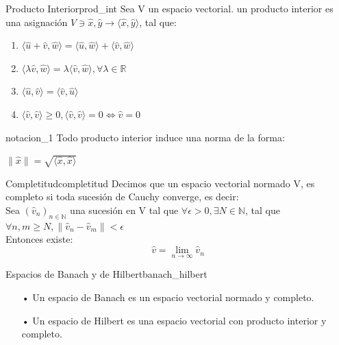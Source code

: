 \documentclass[12pt,a4paper]{book}
\providecommand{\norm}[1]{\lVert#1\rVert}
\providecommand{\inp}[1]{\langle#1\rangle}
\begin{document}
\smallskip

\begin{definicion}{Producto Interior}{prod_int}
Sea V un espacio vectorial. un producto interior es una asignación $V\ni\widehat{x},\widehat{y}\rightarrow \inp{\widehat{x},\widehat{y}}$, tal que:
\begin{enumerate}
\item $\inp{\widehat{u}+\widehat{v},\widehat{w}}=\inp{\widehat{u},\widehat{w}}+\inp{\widehat{v},\widehat{w}}$
\item $\inp{\lambda\widehat{v},\widehat{w}}=\lambda\inp{\widehat{v},\widehat{w}}, \forall\lambda\in\mathbb{R}$
\item $\inp{\widehat{u},\widehat{v}}=\inp{\widehat{v},\widehat{u}}$
\item $\inp{\widehat{v},\widehat{v}}\geq 0, \inp{\widehat{v},\widehat{v}}=0 \Leftrightarrow \widehat{v}=0$
\end{enumerate}
\end{definicion}

\smallskip

\begin{notacion}{}{notacion_1}
Todo producto interior induce una norma de la forma:
\begin{center}
$\norm{\widehat{x}}=\sqrt{\inp{\widehat{x},\widehat{x}}}$
\end{center}
\end{notacion}

\smallskip

\begin{definicion}{Completitud}{completitud}
Decimos que un espacio vectorial normado V, es completo si toda sucesión de Cauchy converge, es decir:\\

Sea $(\widehat{v}_{n})_{n\in\mathbb{N}}$ una sucesión en V tal que $\forall\epsilon >0, \exists N\in\mathbb{N}$, tal que $\forall n,m\geq N, \norm{\widehat{v}_{n}-\widehat{v}_{m}}<\epsilon$\\

Entonces existe: $$\widehat{v}=\lim_{n\rightarrow\infty} \widehat{v}_{n}$$ 
\end{definicion}

\smallskip

\begin{definicion}{Espacios de Banach y de Hilbert}{banach_hilbert}
\begin{enumerate}
\item[•] Un espacio de Banach es un espacio vectorial normado y completo.
\item[•] Un espacio de Hilbert es una espacio vectorial con producto interior y completo.
\end{enumerate}
\end{definicion}
\end{document}
